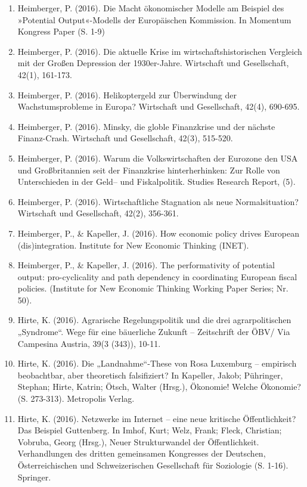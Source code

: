 \begin{enumerate}
	 \item Heimberger, P. (2016). Die Macht ökonomischer Modelle am Beispiel des »Potential Output«-Modells der Europäischen Kommission. In Momentum Kongress Paper (S. 1-9)
	 \item Heimberger, P. (2016). Die aktuelle Krise im wirtschaftshistorischen Vergleich mit der Großen Depression der 1930er-Jahre. Wirtschaft und Gesellschaft, 42(1), 161-173.
	 \item Heimberger, P. (2016). Helikoptergeld zur Überwindung der Wachstumsprobleme in Europa? Wirtschaft und Gesellschaft, 42(4), 690-695.
	 \item Heimberger, P. (2016). Minsky, die globle Finanzkrise und der nächste Finanz-Crash. Wirtschaft und Gesellschaft, 42(3), 515-520.
	 \item Heimberger, P. (2016). Warum die Volkswirtschaften der Eurozone den USA und Großbritannien seit der Finanzkrise hinterherhinken: Zur Rolle von Unterschieden in der Geld– und Fiskalpolitik. Studies Research Report, (5).
	 \item Heimberger, P. (2016). Wirtschaftliche Stagnation als \glqq neue Normalsituation\grqq{}? Wirtschaft und Gesellschaft, 42(2), 356-361.
	 \item Heimberger, P., \& Kapeller, J. (2016). How economic policy drives European (dis)integration. Institute for New Economic Thinking (INET).
	 \item Heimberger, P., \& Kapeller, J. (2016). The performativity of potential output: pro-cyclicality and path dependency in coordinating European fiscal policies. (Institute for New Economic Thinking Working Paper Series; Nr. 50).
	 \item Hirte, K. (2016). Agrarische Regelungspolitik und die drei agrarpolitischen „Syndrome“. Wege für eine bäuerliche Zukunft – Zeitschrift der ÖBV/ Via Campesina Austria, 39(3 (343)), 10-11.
	 \item Hirte, K. (2016). Die „Landnahme“-These von Rosa Luxemburg – empirisch beobachtbar, aber theoretisch falsifiziert? In Kapeller, Jakob; Pühringer, Stephan; Hirte, Katrin; Ötsch, Walter (Hrsg.), Ökonomie! Welche Ökonomie? (S. 273-313). Metropolis Verlag.
	 \item Hirte, K. (2016). Netzwerke im Internet – eine neue kritische Öffentlichkeit? Das Beispiel Guttenberg. In Imhof, Kurt; Welz, Frank; Fleck, Christian; Vobruba, Georg (Hrsg.), Neuer Strukturwandel der Öffentlichkeit. Verhandlungen des dritten gemeinsamen Kongresses der Deutschen, Österreichischen und Schweizerischen Gesellschaft für Soziologie (S. 1-16). Springer.

\end{enumerate}
